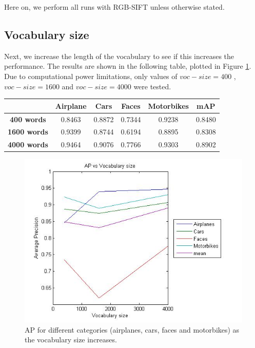 \documentclass[11pt]{article}
\begin{document}
Here on, we perform all runs with RGB-SIFT unless otherwise stated.


\subsection{Vocabulary size}
Next, we increase the length of the vocabulary to see if this increases the performance. The results are shown in the following table, plotted in Figure \ref{fig:voc_size_plot}. Due to computational power limitations, only values of $voc-size = 400$ , $voc-size = 1600$ and $voc-size = 4000$ were tested.

\begin{center}
	\begin{tabular}{| c | c | c | c | c | c |}
		\hline
		\textbf{} & \textbf{Airplane} & \textbf{Cars} & \textbf{Faces} & \textbf{Motorbikes} & \textbf{mAP} \\ \hline
		\textbf{400 words} & 0.8463 & 0.8872 & 0.7344 & 0.9238 & 0.8480 \\ \hline
		\textbf{1600 words} & 0.9399 & 0.8744 & 0.6194 & 0.8895 & 0.8308 \\ \hline
		\textbf{4000 words} & 0.9464 & 0.9076 & 0.7766 & 0.9303 & 0.8902 \\ 
		\hline
	\end{tabular}
\end{center}

\begin{figure}[h]
	\centering
	\includegraphics[width=.8\textwidth]{img/voc_size_plot.jpg}
	\caption{AP for different categories (airplanes, cars, faces and motorbikes) as the vocabulary size increases.}
	\label{fig:voc_size_plot}
\end{figure}
\end{document}
